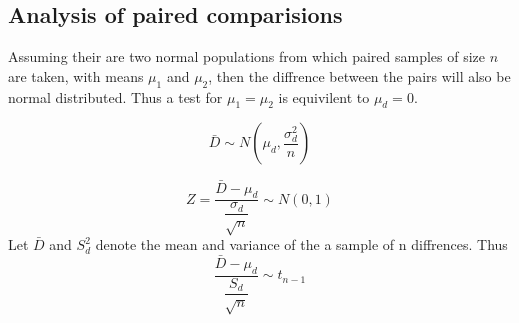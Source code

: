     \subsection{Analysis of paired comparisions}
        Assuming their are two normal populations from which paired samples of size $n$ are taken, with means $\mu_1$ and $\mu_2$, then the diffrence between the pairs will also be normal distributed. Thus a test for $\mu_1 = \mu_2$ is equivilent to $\mu_d = 0$.

        $$
        \bar{D} \sim N\left(\mu_d, \frac{\sigma_d^2}{n}\right)
        $$

        $$
        Z = \dfrac{\bar{D} - \mu_d}{\dfrac{\sigma_d}{\sqrt{n}}} \sim N(0, 1)
        $$
        Let $\bar{D}$ and $S_d^2$ denote the mean and variance of the a sample of n diffrences. Thus
        $$
        \frac{\bar{D} - \mu_d}{\dfrac{S_d}{\sqrt{n}}} \sim t_{n-1}
        $$

